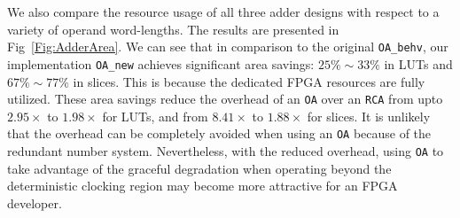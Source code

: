 \documentclass[conference]{IEEEtran}
\begin{document}
We also compare the resource usage of all three adder designs with respect to a variety of operand word-lengths. The results are presented in Fig~\ref{Fig:AdderArea}. We can see that in comparison to the original \texttt{OA\_behv}, our implementation \texttt{OA\_new} achieves significant area savings: $25\%\sim 33\%$ in LUTs and $67\%\sim77\%$ in slices. This is because the dedicated FPGA resources are fully utilized. These area savings reduce the overhead of an \texttt{OA} over an \texttt{RCA} from upto $2.95\times$ to $1.98\times$ for LUTs, and from $8.41\times$ to $1.88\times$ for slices. It is unlikely that the overhead can be completely avoided when using an \texttt{OA} because of the redundant number system. Nevertheless, with the reduced overhead, using \texttt{OA} to take advantage of the graceful degradation when operating beyond the deterministic clocking region may become more attractive for an FPGA developer.

\end{document}

